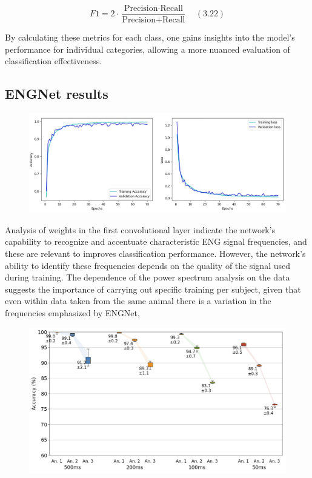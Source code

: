 \documentclass{Configuration_Files/PoliMi3i_thesis}
\begin{document}
\begin{equation}
	F1 = 2 \cdot \frac{\text{Precision} \cdot \text{Recall}}{\text{Precision} + \text{Recall}} \quad (3.22)
	\end{equation}

By calculating these metrics for each class, one gains insights into the model’s performance for individual categories, allowing a more nuanced evaluation of classification effectiveness.



\subsection{ENGNet results}

\begin{figure}[H]
	\includegraphics[scale=0.25]{trainingAccuracyDavide.png}
	\centering
	\end{figure}


Analysis of weights in the first convolutional layer indicate the network’s capability to recognize and accentuate characteristic ENG signal frequencies, and these are relevant to improves classification performance. However, the network’s ability to identify these frequencies depends on the quality of the signal used during training. The dependence of the power spectrum analysis on the data suggests the importance of carrying out specific training per subject, given that even within data taken from the same animal there is a variation in the frequencies emphasized by ENGNet,

\begin{figure}[H]
	\includegraphics[scale=0.25]{engNet_accuracy.png}
	\centering
	\end{figure}
	
\end{document}
